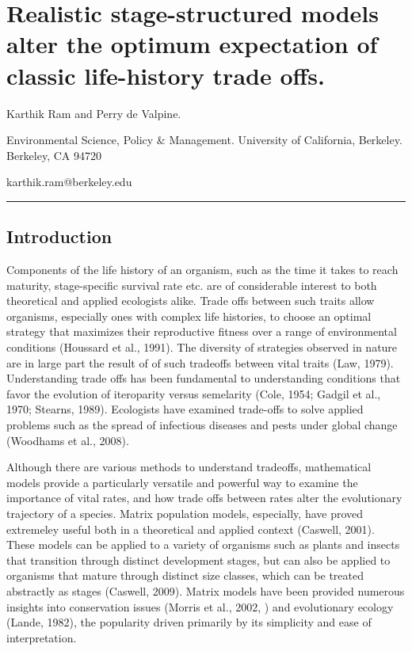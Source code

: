 \documentclass[]{article}
\author{}
\date{}
\begin{document}
\linenumbers
\section{Realistic stage-structured models alter the optimum expectation
of classic life-history trade offs.}

Karthik Ram and Perry de Valpine.

Environmental Science, Policy \& Management. University of California,
Berkeley. Berkeley, CA 94720

karthik.ram@berkeley.edu

\begin{center}\rule{3in}{0.4pt}\end{center}

\subsection{Introduction}

Components of the life history of an organism, such as the time it takes
to reach maturity, stage-specific survival rate etc. are of considerable
interest to both theoretical and applied ecologists alike. Trade offs
between such traits allow organisms, especially ones with complex life
histories, to choose an optimal strategy that maximizes their
reproductive fitness over a range of environmental conditions (Houssard
et al., 1991). The diversity of strategies observed in nature are in
large part the result of of such tradeoffs between vital traits (Law,
1979). Understanding trade offs has been fundamental to understanding
conditions that favor the evolution of iteroparity versus semelarity
(Cole, 1954; Gadgil et al., 1970; Stearns, 1989). Ecologists have
examined trade-offs to solve applied problems such as the spread of
infectious diseases and pests under global change (Woodhams et al.,
2008).

Although there are various methods to understand tradeoffs, mathematical
models provide a particularly versatile and powerful way to examine the
importance of vital rates, and how trade offs between rates alter the
evolutionary trajectory of a species. Matrix population models,
especially, have proved extremeley useful both in a theoretical and
applied context (Caswell, 2001). These models can be applied to a
variety of organisms such as plants and insects that transition through
distinct development stages, but can also be applied to organisms that
mature through distinct size classes, which can be treated abstractly as
stages (Caswell, 2009). Matrix models have been provided numerous
insights into conservation issues (Morris et al., 2002, ) and
evolutionary ecology (Lande, 1982), the popularity driven primarily by
its simplicity and ease of interpretation.
\end{document}
